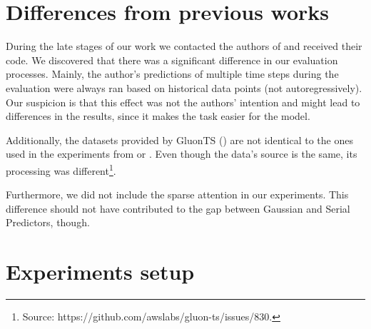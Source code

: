 \documentclass[en]{pracamgr}
\begin{document}
\section{Differences from previous works}\label{s:diff}

During the late stages of our work we contacted the authors of \cite{enhancing} and received their code. We discovered that there was a significant difference in our evaluation processes. 
Mainly, the author's predictions of multiple time steps during the evaluation were always ran based on historical data points (not autoregressively). Our suspicion is that this effect was not the authors' intention and might lead to differences in the results, since it makes the task easier for the model.

Additionally, the datasets provided by GluonTS (\cite{gluonts}) are not identical to the ones used in the experiments from \cite{enhancing} or \cite{deepar}. Even though the data's source is the same, its processing was different\footnote{Source: https://github.com/awslabs/gluon-ts/issues/830.}.

Furthermore, we did not include the sparse attention in our experiments. 
 This difference should not have contributed to the gap between Gaussian and Serial Predictors, though. 


\section{Experiments setup}
\end{document}
